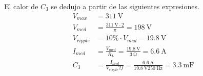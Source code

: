  El calor de $C_3$ se dedujo a partir de las siguientes expresiones.
\begin{align}
	V_{max}  &=\SI{311}{\volt} \\
	V_{med}  & = \frac{\SI{311}{\volt}\cdot 2}{\pi} = \SI{198}{\volt} \\
	V_{ripple} &= 10\% \cdot V_{med} = \SI{19.8}{\volt}\\
	I_{med} &= \frac{V_{med}}{R_L} = \frac{\SI{19.8}{\volt}}{\SI{3}{\ohm}} = \SI{6.6}{\ampere} \\
	C_3 &= \frac{I_{med}}{V_{ripple}2f} = \frac{\SI{6.6}{\ampere}}{\SI{19.8}{\volt}2 \SI{50}{\hertz}} = \boxed{\SI{3.3}{\milli\farad}} \\
\end{align}

